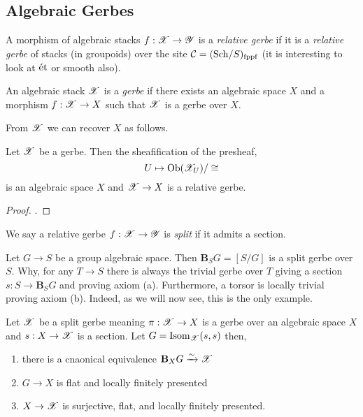 \documentclass[12pt]{article}
\begin{document}
\subsection{Algebraic Gerbes}

\begin{defn}
A morphism of algebraic stacks $f : \mathscr{X} \to \mathscr{Y}$ is a \textit{relative gerbe} if it is a \textit{relative gerbe} of stacks (in groupoids) over the site $\mathcal{C} = (\mathrm{Sch}/S)_{\mathrm{fppf}}$ (it is interesting to look at $\text{\'{e}t}$ or smooth also). 
\end{defn}

\begin{defn}
An algebraic stack $\mathscr{X}$ is a \textit{gerbe} if there exists an algebraic space $X$ and a morphism $f : \mathscr{X} \to X$ such that $\mathscr{X}$ is a gerbe over $X$.
\end{defn}

\begin{rmk}
From $\mathscr{X}$ we can recover $X$ as follows.
\end{rmk}

\begin{lemma}
Let $\mathscr{X}$ be a gerbe. Then the sheafification of the presheaf,
\[ U \mapsto \mathrm{Ob}(\mathscr{X}_U)/\cong \]
is an algebraic space $X$ and $\mathscr{X} \to X$ is a relative gerbe.
\end{lemma}

\begin{proof}
.
\end{proof}

\begin{defn}
We say a relative gerbe $f : \mathscr{X} \to \mathscr{Y}$ is \textit{split} if it admits a section.
\end{defn}

\newcommand{\B}{\mathbf{B}}

\begin{example}
Let $G \to S$ be a group algebraic space. Then $\B_S G = [S / G]$ is a split gerbe over $S$. Why, for any $T \to S$ there is always the trivial gerbe over $T$ giving a section $s : S \to \B_S G$ and proving axiom (a). Furthermore, a torsor is locally trivial proving axiom (b). Indeed, as we will now see, this is the only example.
\end{example}

\begin{prop}
Let $\mathscr{X}$ be a split gerbe meaning $\pi : \mathscr{X} \to X$ is a gerbe over an algebraic space $X$ and $s : X \to \mathscr{X}$ is a section. Let $G = \mathrm{Isom}_{\mathscr{X}}(s,s)$ then,
\begin{enumerate}
\item there is a cnaonical equivalence $\B_X G \iso \X$
\item $G \to X$ is flat and locally finitely presented
\item $X \to \mathscr{X}$ is surjective, flat, and locally finitely presented.
\end{enumerate}
\end{prop}
\end{document}

